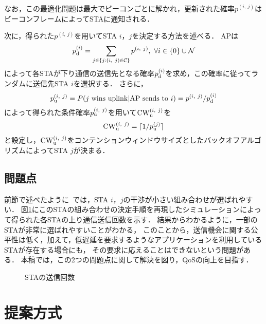 \documentclass[technicalreport]{ieicej}
\newcommand{\sij}{(i,\ j)}
\newcommand{\pij}{p^{(i,\ j)}}
\begin{document}
		なお，この最適化問題は最大でビーコンごとに解かれ，更新された確率$\pij$はビーコンフレームによってSTAに通知される．
		\par
		次に，得られた$\pij$を用いてSTA $i$，$j$を決定する方法を述べる．
		APは
		\begin{equation}
			p_{\rm d}^{(i)}= \sum_{j\in\{j:(i,\ j)\in{\mathcal C}\}}p^{(i,\ j)},\ \forall i \in \{0\}\cup{\mathcal N}
		\end{equation}
		によって各STAが下り通信の送信先となる確率$p_{\rm d}^{(i)}$を求め，この確率に従ってランダムに送信先STA $i$を選択する．
		さらに，
		\begin{equation}
			p_{\rm u}^{\sij} = P(j\ {\rm wins\ uplink|AP\ sends\ to}\ i)=\pij / p_{\rm d}^{(i)}
		\end{equation}
		によって得られた条件確率$p_{\rm u}^{\sij}$を用いて${\rm CW}^{\sij}_{\rm u}$を
		\begin{equation}
			{\rm CW}^{\sij}_{\rm u} = \lceil 1/p_{\rm u}^{(j)} \rceil
		\end{equation}
		と設定し，${\rm CW}^{\sij}_{\rm u}$をコンテンションウィンドウサイズとしたバックオフアルゴリズムによってSTA $j$が決まる．

	\subsection{問題点}
		前節で述べたように~\cite{promac}では，STA $i$，$j$の干渉が小さい組み合わせが選ばれやすい．
		図\ref{fig:numtx}にこのSTAの組み合わせの決定手順を再現したシミュレーションによって得られた各STAの上り通信送信回数を示す．
		結果からわかるように，一部のSTAが非常に選ばれやすいことがわかる，
		このことから，送信機会に関する公平性は低く，加えて，低遅延を要求するようなアプリケーションを利用しているSTAが存在する場合にも，
		その要求に応えることはできないという問題がある．
		本稿では，この2つの問題点に関して解決を図り，QoSの向上を目指す．

		\begin{figure}[t]
			\centering
			\caption{STAの送信回数}
			\label{fig:numtx}
		\end{figure}

\section{提案方式}
\end{document}
